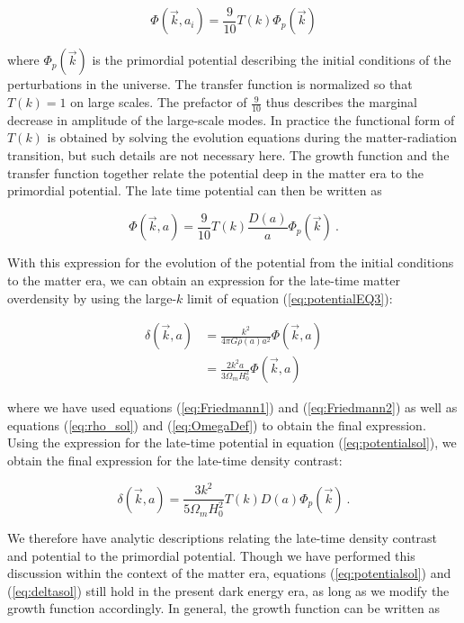\documentclass[10pt,letterpaper,final]{iopart}
\numberwithin{equation}{subsection}
\def\ni{\noindent}
\begin{document}
\begin{equation}\label{eq:potentialT}
\Phi(\vec{k}, a_i) = \frac{9}{10}T(k)\Phi_p(\vec{k}) 
\end{equation}

\ni where $\Phi_p(\vec{k})$ is the primordial potential describing the initial conditions of the perturbations in the universe. The transfer function is normalized so that $T(k) = 1$ on large scales. The prefactor of $\frac{9}{10}$ thus describes the marginal decrease in amplitude of the large-scale modes. In practice the functional form of $T(k)$ is obtained by solving the evolution equations during the matter-radiation transition, but such details are not necessary here. The growth function and the transfer function together relate the potential deep in the matter era to the primordial potential. The late time potential can then be written as

\begin{equation}\label{eq:potentialsol}
\Phi(\vec{k},a) = \frac{9}{10}T(k) \frac{D(a)}{a}\Phi_p (\vec{k}) \ .
\end{equation}

\ni With this expression for the evolution of the potential from the initial conditions to the matter era, we can obtain an expression for the late-time matter overdensity by using the large-$k$ limit of equation (\ref{eq:potentialEQ3}):

\begin{align}
\delta(\vec{k},a) &= \frac{k^2 }{4\pi G\bar{\rho}(a)a^2}\Phi(\vec{k},a) \\
\label{eq:PoissonEQ}&=  \frac{2k^2 a}{3 \Omega_m H^2_0}\Phi(\vec{k},a)
\end{align}

\ni where we have used equations (\ref{eq:Friedmann1}) and (\ref{eq:Friedmann2}) as well as equations (\ref{eq:rho_sol}) and (\ref{eq:OmegaDef}) to obtain the final expression. Using the expression for the late-time potential in equation (\ref{eq:potentialsol}), we obtain the final expression for the late-time density contrast:

\begin{equation}\label{eq:deltasol}
\delta(\vec{k},a) = \frac{3k^2}{5\Omega_m H^2_0}T(k)D(a)\Phi_p(\vec{k}) \ .
\end{equation}

\ni We therefore have analytic descriptions relating the late-time density contrast and potential to the primordial potential. Though we have performed this discussion within the context of the matter era, equations (\ref{eq:potentialsol}) and (\ref{eq:deltasol}) still hold in the present dark energy era, as long as we modify the growth function accordingly. In general, the growth function can be written as 
\end{document}
